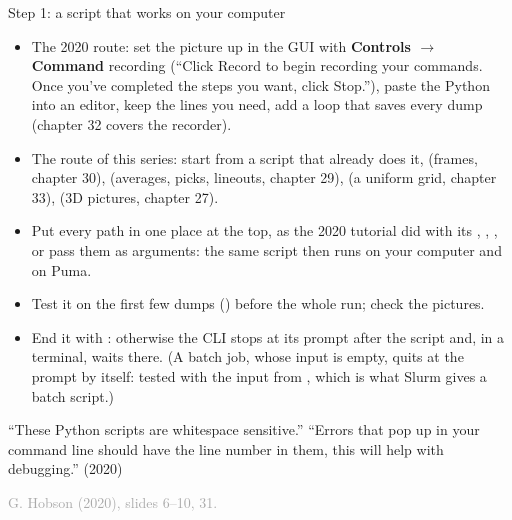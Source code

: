 \documentclass[aspectratio=169,11pt]{beamer}
\newcommand{\sourcecredit}[1]{\vfill\begin{flushright}\tiny\textcolor{DarkGray}{#1}\end{flushright}}
\newcommand{\gui}[1]{\textsf{\textbf{#1}}}
\begin{document}
\begin{frame}{Step 1: a script that works on your computer}
\label{fr:script}
\footnotesize
\begin{itemize}\setlength{\itemsep}{1pt}
  \item The 2020 route: set the picture up in the GUI with \gui{Controls $\to$ Command} recording (``Click Record to begin recording your commands. Once you've completed the steps you want, click Stop.''), paste the Python into an editor, keep the lines you need, add a loop that saves every dump (chapter 32 covers the recorder).
  \item The route of this series: start from a script that already does it,  (frames, chapter 30),  (averages, picks, lineouts, chapter 29),  (a uniform grid, chapter 33),  (3D pictures, chapter 27).
  \item Put every path in one place at the top, as the 2020 tutorial did with its , , , or pass them as arguments: the same script then runs on your computer and on Puma.
  \item Test it on the first few dumps () before the whole run; check the pictures.
  \item End it with : otherwise the CLI stops at its \code{>>>} prompt after the script and, in a terminal, waits there. (A batch job, whose input is empty, quits at the prompt by itself: tested with the input from , which is what Slurm gives a batch script.)
\end{itemize}
\begin{punchbox}
\footnotesize ``These Python scripts are whitespace sensitive.'' ``Errors that pop up in your command line should have the line number in them, this will help with debugging.'' (2020)
\end{punchbox}
\sourcecredit{G. Hobson (2020), slides 6--10, 31.}
\end{frame}
\end{document}
